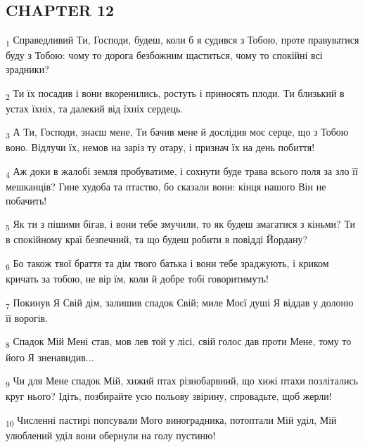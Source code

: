 \subsection{CHAPTER 12}
\begin{tcolorbox}
\textsubscript{1} Справедливий Ти, Господи, будеш, коли б я судився з Тобою, проте правуватися буду з Тобою: чому то дорога безбожним щаститься, чому то спокійні всі зрадники?
\end{tcolorbox}
\begin{tcolorbox}
\textsubscript{2} Ти їх посадив і вони вкоренились, ростуть і приносять плоди. Ти близький в устах їхніх, та далекий від їхніх сердець.
\end{tcolorbox}
\begin{tcolorbox}
\textsubscript{3} А Ти, Господи, знаєш мене, Ти бачив мене й дослідив моє серце, що з Тобою воно. Відлучи їх, немов на заріз ту отару, і признач їх на день побиття!
\end{tcolorbox}
\begin{tcolorbox}
\textsubscript{4} Аж доки в жалобі земля пробуватиме, і сохнути буде трава всього поля за зло її мешканців? Гине худоба та птаство, бо сказали вони: кінця нашого Він не побачить!
\end{tcolorbox}
\begin{tcolorbox}
\textsubscript{5} Як ти з пішими бігав, і вони тебе змучили, то як будеш змагатися з кіньми? Ти в спокійному краї безпечний, та що будеш робити в повідді Йордану?
\end{tcolorbox}
\begin{tcolorbox}
\textsubscript{6} Бо також твої браття та дім твого батька і вони тебе зраджують, і криком кричать за тобою, не вір їм, коли й добре тобі говоритимуть!
\end{tcolorbox}
\begin{tcolorbox}
\textsubscript{7} Покинув Я Свій дім, залишив спадок Свій; миле Моєї душі Я віддав у долоню її ворогів.
\end{tcolorbox}
\begin{tcolorbox}
\textsubscript{8} Спадок Мій Мені став, мов лев той у лісі, свій голос дав проти Мене, тому то його Я зненавидив...
\end{tcolorbox}
\begin{tcolorbox}
\textsubscript{9} Чи для Мене спадок Мій, хижий птах різнобарвний, що хижі птахи позлітались круг нього? Ідіть, позбирайте усю польову звірину, спровадьте, щоб жерли!
\end{tcolorbox}
\begin{tcolorbox}
\textsubscript{10} Численні пастирі попсували Мого виноградника, потоптали Мій уділ, Мій улюблений уділ вони обернули на голу пустиню!
\end{tcolorbox}
